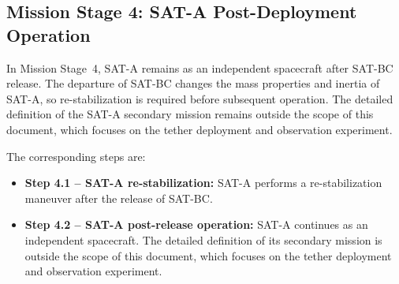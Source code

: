 \subsection{Mission Stage 4: SAT-A Post-Deployment Operation}
\label{sub:conops_stage4_sata_post_deployment}
In Mission Stage~4, SAT-A remains as an independent spacecraft after SAT-BC release. The departure of SAT-BC changes the mass properties and inertia of SAT-A, so re-stabilization is required before subsequent operation. The detailed definition of the SAT-A secondary mission remains outside the scope of this document, which focuses on the tether deployment and observation experiment.

The corresponding steps are:
\begin{itemize}
    \item \textbf{Step 4.1 -- SAT-A re-stabilization:} SAT-A performs a re-stabilization maneuver after the release of SAT-BC.

    \item \textbf{Step 4.2 -- SAT-A post-release operation:} SAT-A continues as an independent spacecraft. The detailed definition of its secondary mission is outside the scope of this document, which focuses on the tether deployment and observation experiment.
\end{itemize}






